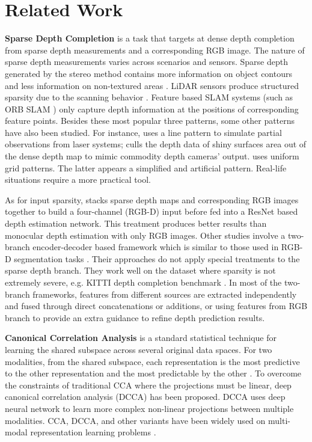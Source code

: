 \documentclass{article}
\begin{document}
\section{Related Work}
\label{RelatedWork}
\textbf{Sparse Depth Completion} is a task that targets at dense depth completion from sparse depth measurements and a corresponding RGB image. The nature of sparse depth measurements varies across scenarios and sensors. Sparse depth generated by the stereo method contains more information on object contours and less information on non-textured areas \cite{forsyth2003modern}. LiDAR sensors produce structured sparsity due to the scanning behavior \cite{geiger2012we}. Feature based SLAM systems (such as ORB SLAM \cite{mur2015orb}) only capture depth information at the positions of corresponding feature points. Besides these most popular three patterns, some other patterns have also been studied. For instance, \cite{liao2017parse} uses a line pattern to simulate partial observations from laser systems; \cite{zhang2018deep} culls the depth data of shiny surfaces area out of the dense depth map to mimic commodity depth cameras' output. \cite{chen2018estimating} uses uniform grid patterns. The latter appears a simplified and artificial pattern. Real-life situations require a more practical tool.

As for input sparsity, \cite{Ma2017SparseToDense} stacks sparse depth maps and corresponding RGB images together to build a four-channel (RGB-D) input before fed into a ResNet based depth estimation network. This treatment produces better results than monocular depth estimation with only RGB images. Other studies involve a two-branch encoder-decoder based framework which is similar to those used in RGB-D segmentation tasks \cite{yang2019dense,zhang2019dfinenet,imran2019depth,Jaritz_2018}. Their approaches do not apply special treatments to the sparse depth branch. They work well on the dataset where sparsity is not extremely severe, e.g. KITTI depth completion benchmark \cite{uhrig2017sparsity}. In most of the two-branch frameworks, features from different sources are extracted independently and fused through direct concatenations or additions, or using features from RGB branch to provide an extra guidance to refine depth prediction results.

\textbf{Canonical Correlation Analysis} is a standard statistical technique for learning the shared subspace across several original data spaces. For two modalities, from the shared subspace, each representation is the most predictive to the other representation and the most predictable by the other \cite{hotelling1992relations,anderson1962introduction}. To overcome the constraints of traditional CCA where the projections must be linear, deep canonical correlation analysis (DCCA) \cite{andrew2013deep,wang2015deep} has been proposed. DCCA uses deep neural network to learn more complex non-linear projections between multiple modalities. CCA, DCCA, and other variants have been widely used on multi-modal representation learning problems \cite{ding2016comprehensive,yang2017canonical,wang2015unsupervised,kan2016multi,yan2015deep,mroueh2015deep,katsurai2016image}.
\end{document}
